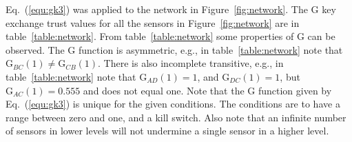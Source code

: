 \documentclass{ws-fnl2}
\begin{document}
Eq.~(\ref{equ:gk3}) was applied to the network in Figure~\ref{fig:network}. The G key exchange trust values for all the sensors in Figure~\ref{fig:network} are in table~\ref{table:network}. From table~\ref{table:network} some properties of G can be observed. The G function is asymmetric, e.g., in table~\ref{table:network} note that $\mathrm{G}_{BC}(1) \neq \mathrm{G}_{CB}(1)$. There is also incomplete transitive, e.g., in table~\ref{table:network} note that $\mathrm{G}_{AD}(1) = 1$, and $\mathrm{G}_{DC}(1) = 1$, but $\mathrm{G}_{AC}(1) = 0.555$ and does not equal one. Note that the G function given by Eq.~(\ref{equ:gk3}) is unique for the given conditions. The conditions are to have a range between zero and one, and a kill switch. Also note that an infinite number of sensors in lower levels will not undermine a single sensor in a higher level.
\end{document}
